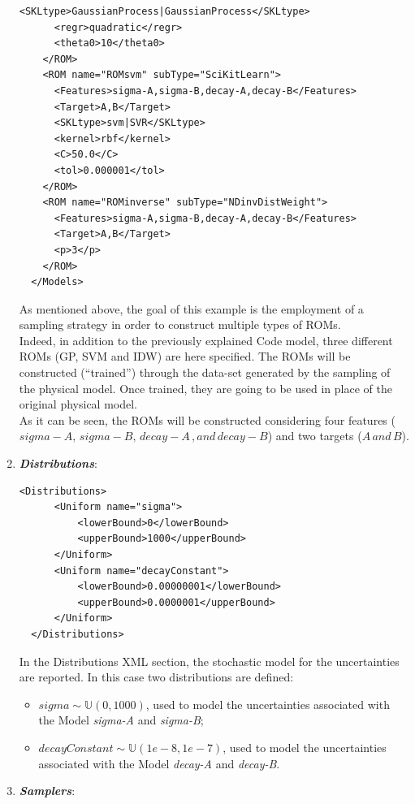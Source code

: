 \begin{enumerate}
\begin{lstlisting}[style=XML,morekeywords={arg,extension,pauseAtEnd,overwrite}]
      <SKLtype>GaussianProcess|GaussianProcess</SKLtype>
      <regr>quadratic</regr>
      <theta0>10</theta0>
    </ROM>
    <ROM name="ROMsvm" subType="SciKitLearn">
      <Features>sigma-A,sigma-B,decay-A,decay-B</Features>
      <Target>A,B</Target>
      <SKLtype>svm|SVR</SKLtype>
      <kernel>rbf</kernel>
      <C>50.0</C>
      <tol>0.000001</tol>
    </ROM>
    <ROM name="ROMinverse" subType="NDinvDistWeight">
      <Features>sigma-A,sigma-B,decay-A,decay-B</Features>
      <Target>A,B</Target>
      <p>3</p>
    </ROM>
  </Models>
\end{lstlisting}
 As mentioned above, the goal of this example is the employment of 
 a sampling strategy in order to construct multiple types of ROMs. 
 \\Indeed, in addition to the previously explained Code 
 model,
 three different ROMs (GP, SVM and IDW) are here specified. The ROMs will be
 constructed (``trained'') through the data-set generated by the sampling of the physical model. Once trained, they are going
 to be used in place of the original physical model. 
 \\As it can be seen,
 the ROMs will be constructed considering four features ($sigma-A,\,sigma-B,\, decay-A \,,and \, decay-B$) and two targets 
 ($A \, and \, B$).
   \item \textbf{\textit{Distributions}}:
\begin{lstlisting}[style=XML]
  <Distributions>
      <Uniform name="sigma">
          <lowerBound>0</lowerBound>
          <upperBound>1000</upperBound>
      </Uniform>
      <Uniform name="decayConstant">
          <lowerBound>0.00000001</lowerBound>
          <upperBound>0.0000001</upperBound>
      </Uniform>
  </Distributions>
\end{lstlisting}
  In the Distributions XML section, the stochastic model for the 
  uncertainties are reported. In 
  this case two distributions are defined: 
  \begin{itemize}
    \item $sigma \sim \mathbb{U}(0,1000)$, used to model the uncertainties 
    associated with  the Model \textit{sigma-A} and \textit{sigma-B};
    \item  $decayConstant \sim \mathbb{U}(1e-8,1e-7)$,  used to 
    model the uncertainties 
    associated with  the Model \textit{decay-A} and \textit{decay-B}.
  \end{itemize}
   \item \textbf{\textit{Samplers}}:
\begin{lstlisting}[style=XML,morekeywords={arg,extension,pauseAtEnd,overwrite}]

\end{lstlisting}
\end{enumerate}
